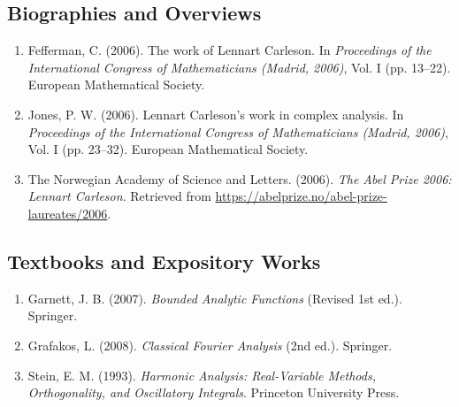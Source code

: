 \subsection*{Biographies and Overviews}
\begin{enumerate}
    \item Fefferman, C. (2006). The work of Lennart Carleson. In \textit{Proceedings of the International Congress of Mathematicians (Madrid, 2006)}, Vol. I (pp. 13--22). European Mathematical Society.
    \item Jones, P. W. (2006). Lennart Carleson's work in complex analysis. In \textit{Proceedings of the International Congress of Mathematicians (Madrid, 2006)}, Vol. I (pp. 23--32). European Mathematical Society.
    \item The Norwegian Academy of Science and Letters. (2006). \textit{The Abel Prize 2006: Lennart Carleson}. Retrieved from \url{https://abelprize.no/abel-prize-laureates/2006}.
\end{enumerate}

\subsection*{Textbooks and Expository Works}
\begin{enumerate}
    \item Garnett, J. B. (2007). \textit{Bounded Analytic Functions} (Revised 1st ed.). Springer.
    \item Grafakos, L. (2008). \textit{Classical Fourier Analysis} (2nd ed.). Springer.
    \item Stein, E. M. (1993). \textit{Harmonic Analysis: Real-Variable Methods, Orthogonality, and Oscillatory Integrals}. Princeton University Press.
\end{enumerate}
